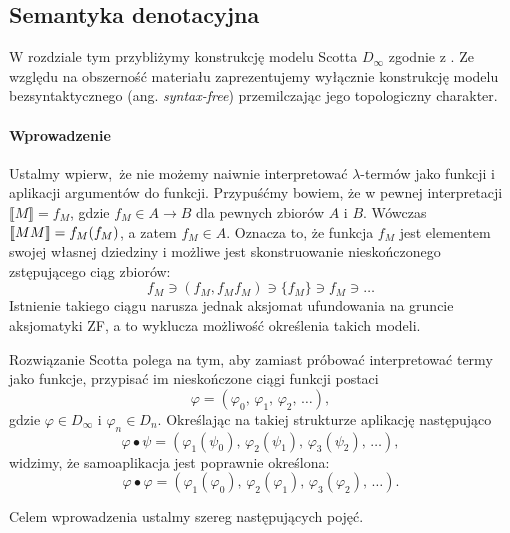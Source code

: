 \subsection{Semantyka denotacyjna}
W rozdziale tym przybliżymy konstrukcję modelu Scotta \(D_\infty\) zgodnie z \cite[Rozdział 16]{Hindley:2008:LCI:1388400}. Ze względu na obszerność materiału zaprezentujemy wyłącznie konstrukcję modelu bezsyntaktycznego (ang. \emph{syntax-free}) przemilczając jego topologiczny charakter. %

\paragraph{Wprowadzenie}
Ustalmy wpierw, że nie możemy naiwnie interpretować \(\lambda\)-termów jako funkcji i aplikacji argumentów do funkcji. Przypuśćmy bowiem, że w pewnej interpretacji \(\llbracket M \rrbracket=f_M\), gdzie \(f_M \in A\to B\) dla pewnych zbiorów \(A\) i \(B\). Wówczas \(\llbracket M M\rrbracket=\nobreak f_M(f_M)\), a zatem \(f_M\in A\). Oznacza to, że funkcja \(f_M\) jest elementem swojej własnej dziedziny i możliwe jest skonstruowanie nieskończonego zstępującego ciąg zbiorów:
\[
  f_M \ni (f_M, f_M f_M)  \ni\{f_M\} \ni f_M \ni \dots
\]
Istnienie takiego ciągu narusza jednak aksjomat ufundowania na gruncie aksjomatyki ZF, a to wyklucza możliwość określenia takich modeli.

Rozwiązanie Scotta polega na tym, aby zamiast próbować interpretować termy jako funkcje, przypisać im nieskończone ciągi funkcji postaci 
\[
  \varphi = (\varphi_0,\,\varphi_1,\,\varphi_2,\,\dots),
\]
gdzie \(\varphi \in D_\infty\) i \(\varphi_n\in D_n\). Określając na takiej strukturze aplikację następująco
\[
  \varphi\bullet\psi = (\varphi_1(\psi_0),\,\varphi_2(\psi_1),\,\varphi_3(\psi_2),\,\dots),
\]
widzimy, że samoaplikacja jest poprawnie określona: 
\[
  \varphi\bullet\varphi = (\varphi_1(\varphi_0),\,\varphi_2(\varphi_1),\,\varphi_3(\varphi_2),\,\dots).
\]

Celem wprowadzenia ustalmy szereg następujących pojęć.


